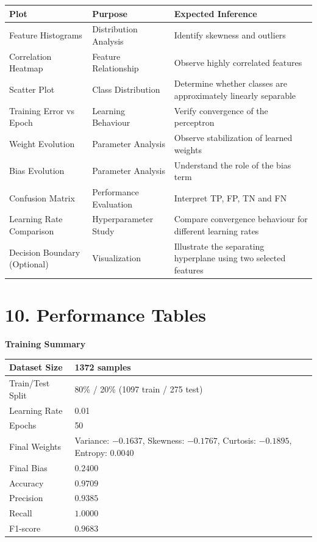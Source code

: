 \documentclass[11pt]{article}
\begin{document}
\begin{longtable}{|p{3.4cm}|p{3.4cm}|p{6cm}|}
\hline
\textbf{Plot} & \textbf{Purpose} & \textbf{Expected Inference}\\
\hline
Feature Histograms & Distribution Analysis & Identify skewness and outliers\\
\hline
Correlation Heatmap & Feature Relationship & Observe highly correlated features\\
\hline
Scatter Plot & Class Distribution & Determine whether classes are approximately linearly separable\\
\hline
Training Error vs Epoch & Learning Behaviour & Verify convergence of the perceptron\\
\hline
Weight Evolution & Parameter Analysis & Observe stabilization of learned weights\\
\hline
Bias Evolution & Parameter Analysis & Understand the role of the bias term\\
\hline
Confusion Matrix & Performance Evaluation & Interpret TP, FP, TN and FN\\
\hline
Learning Rate Comparison & Hyperparameter Study & Compare convergence behaviour for different learning rates\\
\hline
Decision Boundary (Optional) & Visualization & Illustrate the separating hyperplane using two selected features\\
\hline
\end{longtable}

\section*{10. Performance Tables}

\textbf{Training Summary}

\begin{tabular}{|p{6cm}|p{7cm}|}
\hline
Dataset Size & 1372 samples\\
\hline
Train/Test Split & 80\% / 20\% (1097 train / 275 test)\\
\hline
Learning Rate & 0.01\\
\hline
Epochs & 50 \\
\hline
Final Weights & Variance: $-0.1637$, Skewness: $-0.1767$, Curtosis: $-0.1895$, Entropy: $0.0040$\\
\hline
Final Bias & $0.2400$\\
\hline
Accuracy & $0.9709$ \\
\hline
Precision & $0.9385$ \\
\hline
Recall & $1.0000$ \\
\hline
F1-score & $0.9683$ \\
\hline
\end{tabular}
\end{document}
